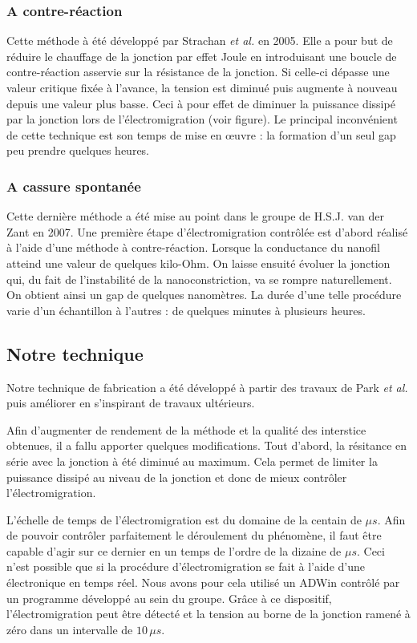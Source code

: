 \subsubsection{A contre-réaction}
Cette méthode à été développé par Strachan \textit{et al.} en 2005. Elle a pour but de réduire le chauffage de la jonction par effet Joule en introduisant une boucle de contre-réaction asservie sur la résistance de la jonction. Si celle-ci dépasse une valeur critique fixée à l'avance, la tension est diminué puis augmente à nouveau depuis une valeur plus basse. Ceci à pour effet de diminuer la puissance dissipé par la jonction lors de l'électromigration (voir figure). Le principal inconvénient de cette technique est son temps de mise en œuvre : la formation d'un seul gap peu prendre quelques heures.

\subsubsection{A cassure spontanée}
Cette dernière méthode a été mise au point dans le groupe de H.S.J. van der Zant en 2007. Une première étape d'électromigration contrôlée est d'abord réalisé à l'aide d'une méthode à contre-réaction. Lorsque la conductance du nanofil atteind une valeur de quelques kilo-Ohm. On laisse ensuité évoluer la jonction qui, du fait de l'instabilité de la nanoconstriction, va se rompre naturellement. On obtient ainsi un gap de quelques nanomètres. La durée d'une telle procédure varie d'un échantillon à l'autres : de quelques minutes à plusieurs heures.

\subsection{Notre technique}
Notre technique de fabrication a été développé à partir des travaux de Park \textit{et al.} puis améliorer en s'inspirant de travaux ultérieurs.

Afin d'augmenter de rendement de la méthode et la qualité des interstice obtenues, il a fallu apporter quelques modifications. Tout d’abord, la résitance en série avec la jonction à été diminué au maximum. Cela permet de limiter la puissance dissipé au niveau de la jonction et donc de mieux contrôler l'électromigration.

L'échelle de temps de l'électromigration est du domaine de la centain de $\mu s$. Afin de pouvoir contrôler parfaitement le déroulement du phénomène, il faut être capable d'agir sur ce dernier en un temps de l'ordre de la dizaine de $\mu s$. Ceci n'est possible que si la procédure d'électromigration se fait à l'aide d'une électronique en temps réel. Nous avons pour cela utilisé un ADWin contrôlé par un programme développé au sein du groupe. Grâce à ce dispositif, l'électromigration peut être détecté et la tension au borne de la jonction ramené à zéro dans un intervalle de $10\, \mu s$.

